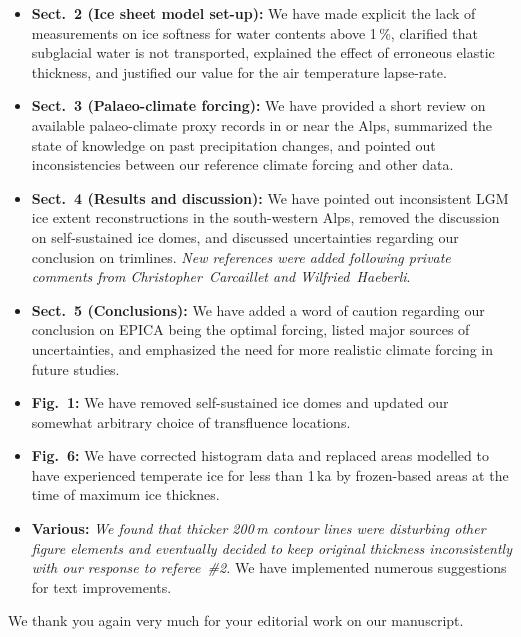     \begin{itemize}

        \item \textbf{Sect.~2 (Ice sheet model set-up):}
        We have made explicit the lack of measurements on ice softness for
        water contents above 1\,\%, clarified that subglacial water is not
        transported, explained the effect of erroneous elastic thickness, and
        justified our value for the air temperature lapse-rate.

        \item \textbf{Sect.~3 (Palaeo-climate forcing):}
        We have provided a short review on available palaeo-climate proxy
        records in or near the Alps, summarized the state of knowledge on past
        precipitation changes, and pointed out inconsistencies between our
        reference climate forcing and other data.

        \item \textbf{Sect.~4 (Results and discussion):}
        We have pointed out inconsistent LGM ice extent reconstructions in the
        south-western Alps, removed the discussion on self-sustained ice domes,
        and discussed uncertainties regarding our conclusion on trimlines.
        \emph{New references were added following private comments from
              Christopher~Carcaillet and Wilfried~Haeberli}.

        \item \textbf{Sect.~5 (Conclusions):}
        We have added a word of caution regarding our conclusion on EPICA being
        the optimal forcing, listed major sources of uncertainties, and
        emphasized the need for more realistic climate forcing in future
        studies.

        \item \textbf{Fig.~1:}
        We have removed self-sustained ice domes and updated our somewhat
        arbitrary choice of transfluence locations.

        \item \textbf{Fig.~6:}
        We have corrected histogram data and replaced areas modelled to have
        experienced temperate ice for less than 1\,ka by frozen-based areas
        at the time of maximum ice thicknes.

        \item \textbf{Various:}
        \emph{We found that thicker 200\,m contour lines were disturbing other
              figure elements and eventually decided to keep original thickness
              inconsistently with our response to referee~\#2.}
        We have implemented numerous suggestions for text improvements.

    \end{itemize}

    We thank you again very much for your editorial work on our manuscript.


